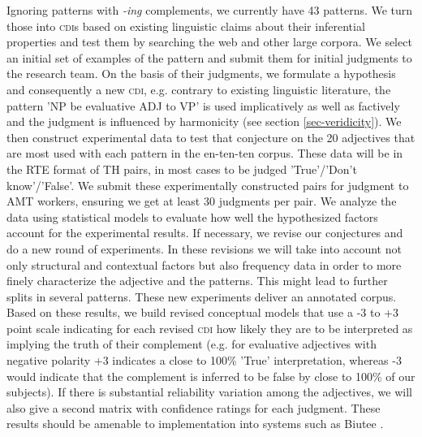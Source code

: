 \documentclass[10pt]{article}
\begin{document}
\vspace {-3mm}

Ignoring patterns with \emph{-ing} complements, we currently have 43 patterns. We turn those into \textsc{cdi}s based on existing linguistic claims about their inferential properties and test them by searching the web and other large corpora. We select an initial set of examples of the pattern and submit them for initial judgments to the research team. On the basis of their judgments, we formulate a hypothesis and consequently a new \textsc{cdi}, e.g. contrary to existing linguistic literature, the pattern 'NP be evaluative ADJ to VP' is used implicatively as well as factively and the judgment is influenced by harmonicity (see section \ref{sec-veridicity}). We then construct experimental data to test that conjecture on the 20 adjectives that are most used with each pattern in the en-ten-ten corpus. These data will be in the RTE format of TH pairs, in most cases to be judged 'True'/'Don't know'/'False'. We submit these experimentally constructed pairs for judgment to AMT workers, ensuring we get at least 30 judgments per pair. We analyze the data using statistical models to evaluate how well the hypothesized factors account for the experimental results. If necessary, we revise our conjectures and do a new round of experiments. In these revisions we will take into account not only structural and contextual factors but also frequency data in order to more finely characterize the adjective and the patterns. This might lead to further splits in several patterns. These new experiments deliver an annotated corpus. Based on these results, we build revised conceptual models that use a -3 to +3 point scale indicating for each revised \textsc{cdi} how likely they are to be interpreted as implying the truth of their complement (e.g. for evaluative adjectives with negative polarity +3 indicates a close to 100\% 'True' interpretation, whereas -3 would indicate that the complement is inferred to be false by close to 100\% of our subjects). If there is substantial reliability variation among the adjectives, we will also give a second matrix with confidence ratings for each judgment.  These results should be amenable to implementation into systems such as Biutee \cite{biutee}.


\end{document}
